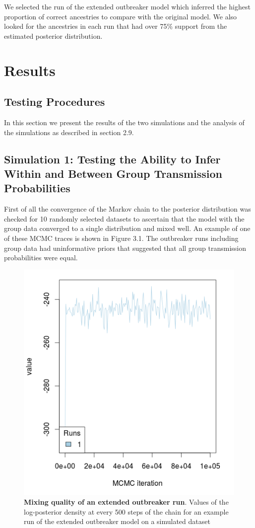 \documentclass[11pt,a4paper]{report}
\begin{document}
We selected the run of the extended outbreaker model which inferred the highest proportion of correct ancestries to compare with the original model. We also looked for the ancestries in each run that had over 75\% support from the estimated posterior distribution. 

\chapter{Results}
\section{Testing Procedures}
In this section we present the results of the two simulations and the analysis of the simulations as described in section 2.9.
\section{Simulation 1: Testing the Ability to Infer Within and Between Group Transmission Probabilities}
First of all the convergence of the Markov chain to the posterior distribution was checked for 10 randomly selected datasets to ascertain that the model with the group data converged to a single distribution and mixed well. An example of one of these MCMC traces is shown in Figure 3.1. The outbreaker runs including group data had uninformative priors that suggested that all group transmission probabilities were equal. 
\begin{figure}
\centering
\includegraphics[scale=0.6]{trace.png}
\newline
\caption{{\bf Mixing quality of an extended outbreaker run}. Values of the log-posterior density at every 500 steps of the chain for an example run of the extended outbreaker model on a simulated dataset}
\end{figure}
\end{document}
